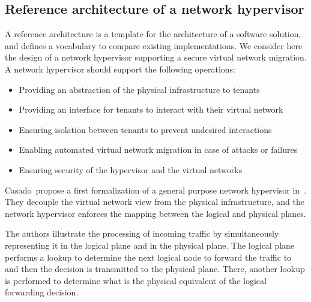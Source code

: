 \newpage
\subsection{Reference architecture of a network hypervisor}
\label{sec:reference_archi}
A reference architecture is a template for the architecture of a software solution, and defines a vocabulary to compare existing implementations. 
We consider here the design of a network hypervisor supporting a secure virtual network migration.
A network hypervisor should support the following operations:
\begin{itemize}
    \item Providing an abstraction of the physical infrastructure to tenants
    \item Providing an interface for tenants to interact with their virtual network
    \item Ensuring isolation between tenants to prevent undesired interactions 
    \item Enabling automated virtual network migration in case of attacks or failures
    \item Ensuring security of the hypervisor and the virtual networks
\end{itemize}

Casado~\etal propose a first formalization of a general purpose network hypervisor in~\cite{Netvirt_Definition-Casado2010}. They decouple the virtual network view from the physical infrastructure, and the network hypervisor enforces the mapping between the logical and physical planes.

The authors illustrate the processing of incoming traffic by simultaneously representing it in the logical plane and in the physical plane.
The logical plane performs a lookup to determine the next logical node to forward the traffic to and then the decision is transmitted to the physical plane. There, another lookup is performed to determine what is the physical equivalent of the logical forwarding decision.

